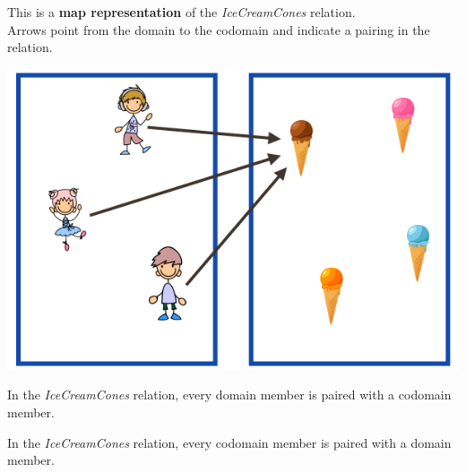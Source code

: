 \documentclass{ximera}
\author{Lee Wayand}
\begin{document}
\begin{exercise}

This is a \textbf{map representation} of the \textit{IceCreamCones} relation. \\


Arrows point from the domain to the codomain and indicate a pairing in the relation.


\begin{image}
\includegraphics{../../pics/func_maps/f_23.png}
\end{image}




\begin{question} 
In the \textit{IceCreamCones} relation, every domain member is paired with a codomain member.

\begin{multipleChoice}
\end{multipleChoice}
\end{question}







\begin{question} 
In the \textit{IceCreamCones} relation, every codomain member is paired with a domain member.

\begin{multipleChoice}
\end{multipleChoice}
\end{question}








\end{exercise}
\end{document}

